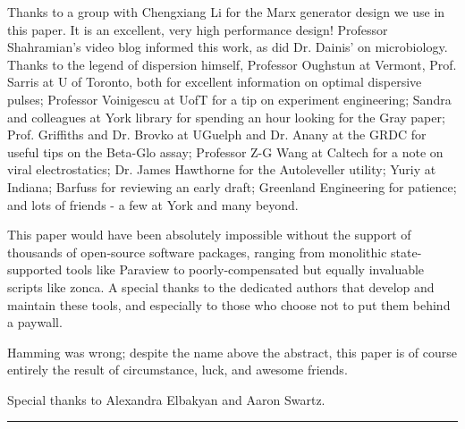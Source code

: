 \documentclass[paper.tex]{subfiles}
\begin{document}
Thanks to a group with Chengxiang Li for the Marx generator design we use in this paper. It is an excellent, very high performance design! Professor Shahramian's video blog informed this work, as did Dr. Dainis' on microbiology. Thanks to the legend of dispersion himself, Professor Oughstun at Vermont, Prof. Sarris at U of Toronto, both for excellent information on optimal dispersive pulses; Professor Voinigescu at UofT for a tip on experiment engineering; Sandra and colleagues at York library for spending an hour looking for the Gray paper; Prof. Griffiths and Dr. Brovko at UGuelph and Dr. Anany at the GRDC for useful tips on the Beta-Glo assay; Professor Z-G Wang at Caltech for a note on viral electrostatics; Dr. James Hawthorne for the Autoleveller utility; Yuriy at Indiana; Barfuss for reviewing an early draft; Greenland Engineering for patience; and lots of friends - a few at York and many beyond. 

This paper would have been absolutely impossible without the support of thousands of open-source software packages, ranging from monolithic state-supported tools like Paraview to poorly-compensated but equally invaluable scripts like zonca. A special thanks to the dedicated authors that develop and maintain these tools, and especially to those who choose not to put them behind a paywall.

Hamming was wrong; despite the name above the abstract, this paper is of course entirely the result of circumstance, luck, and awesome friends. 

Special thanks to Alexandra Elbakyan and Aaron Swartz.

\rule{\linewidth}{0.2pt}




\end{document}
